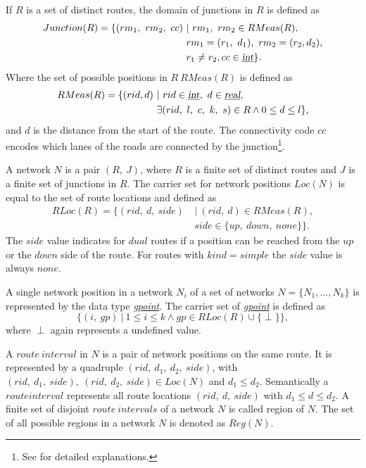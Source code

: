 \documentclass[a4paper]{article}
\newcommand{\dt}[1]{\textsl{\underline{#1}}}
\begin{document}
If $R$ is a set of distinct routes, the domain of junctions in $R$ is defined as
\[
  \begin{split}
    Junction(R)=\{(rm_1,\ rm_2,\ cc)\ &|\ rm_1,\ rm_2 \in RMeas(R),\\
&rm_1 = (r_1,\ d_1),\ rm_2 = (r_2, d_2),\\
&r_1 \neq r_2, cc \in \dt{int}\}.
  \end{split}
\]
Where the set of possible positions in $R\ RMeas(R)$ is defined as
\[
  \begin{split}
    RMeas(R) = \{(rid, d)\ &|\ rid \in \dt{int},\ d \in \dt{real},\\
&\exists (rid,\ l,\ c,\ k,\ s) \in R \wedge 0 \leq d \leq l\},
  \end{split}
\]
and $d$ is the distance from the start of the route.
The connectivity code $cc$ encodes which lanes of the roads are connected
by the junction\footnote{See \cite{NetworkGueting} for detailed explanations.}.

A network $N$ is a pair $(R,\ J)$, where $R$ is a finite set of distinct routes
and $J$ is a finite set of junctions in $R$. The carrier set for network
positions $Loc(N)$ is equal to the set of route locations and defined as
\[
  \begin{split}
    RLoc(R)=\{(rid,\ d,\ side)\ &|\ (rid,\ d) \in RMeas(R),\\
&side \in \{up,\ down,\ none\}\}.
  \end{split}
\]
The $side$ value indicates for $dual$ routes if a position can be reached
from the $up$ or the $down$ side of the route. For routes with $kind = simple$ the
$side$ value is always $none$.

A single network position in a network $N_i$ of a set of networks $N=\{N_1,\ldots,N_k\}$
is represented by the data type \dt{gpoint}. The carrier set of \dt{gpoint} is defined as
\[\{(i,\ gp)\ |\ 1 \leq i \leq k \wedge gp \in RLoc(R) \cup \{ \perp \}\},\]
where $\perp$ again represents a undefined value.

A $route\ interval$ in $N$ is a pair of network positions on the same route. It
is represented by a quadruple $(rid,\ d_1,\ d_2,\ side)$, with
$(rid,\ d_1,\ side),\ (rid,\ d_2,\ side) \in Loc(N)$
and $d_1 \leq d_2$. Semantically
a $route interval$ represents all route locations $(rid,\ d,\ side)$ with
$d_1 \leq d \leq d_2$. A finite set of disjoint $route\ intervals$ of a network
$N$ is called region of $N$. The set of all possible regions in a network $N$ is
denoted as $Reg(N)$.
\end{document}

